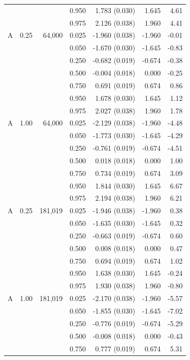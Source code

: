 \begin{tabular}{lrrrrrr}
 &  &  & 0.950 & 1.783 (0.030) & 1.645 & 4.61 \\
 &  &  & 0.975 & 2.126 (0.038) & 1.960 & 4.41 \\
\addlinespace
A & 0.25 & 64,000 & 0.025 & -1.960 (0.038) & -1.960 & -0.01 \\
 &  &  & 0.050 & -1.670 (0.030) & -1.645 & -0.83 \\
 &  &  & 0.250 & -0.682 (0.019) & -0.674 & -0.38 \\
 &  &  & 0.500 & -0.004 (0.018) & 0.000 & -0.25 \\
 &  &  & 0.750 & 0.691 (0.019) & 0.674 & 0.86 \\
 &  &  & 0.950 & 1.678 (0.030) & 1.645 & 1.12 \\
 &  &  & 0.975 & 2.027 (0.038) & 1.960 & 1.78 \\
\addlinespace
A & 1.00 & 64,000 & 0.025 & -2.129 (0.038) & -1.960 & -4.48 \\
 &  &  & 0.050 & -1.773 (0.030) & -1.645 & -4.29 \\
 &  &  & 0.250 & -0.761 (0.019) & -0.674 & -4.51 \\
 &  &  & 0.500 & 0.018 (0.018) & 0.000 & 1.00 \\
 &  &  & 0.750 & 0.734 (0.019) & 0.674 & 3.09 \\
 &  &  & 0.950 & 1.844 (0.030) & 1.645 & 6.67 \\
 &  &  & 0.975 & 2.194 (0.038) & 1.960 & 6.21 \\
\addlinespace
A & 0.25 & 181,019 & 0.025 & -1.946 (0.038) & -1.960 & 0.38 \\
 &  &  & 0.050 & -1.635 (0.030) & -1.645 & 0.32 \\
 &  &  & 0.250 & -0.663 (0.019) & -0.674 & 0.60 \\
 &  &  & 0.500 & 0.008 (0.018) & 0.000 & 0.47 \\
 &  &  & 0.750 & 0.694 (0.019) & 0.674 & 1.02 \\
 &  &  & 0.950 & 1.638 (0.030) & 1.645 & -0.24 \\
 &  &  & 0.975 & 1.930 (0.038) & 1.960 & -0.80 \\
\addlinespace
A & 1.00 & 181,019 & 0.025 & -2.170 (0.038) & -1.960 & -5.57 \\
 &  &  & 0.050 & -1.855 (0.030) & -1.645 & -7.02 \\
 &  &  & 0.250 & -0.776 (0.019) & -0.674 & -5.29 \\
 &  &  & 0.500 & -0.008 (0.018) & 0.000 & -0.43 \\
 &  &  & 0.750 & 0.777 (0.019) & 0.674 & 5.31 \\

\end{tabular}
